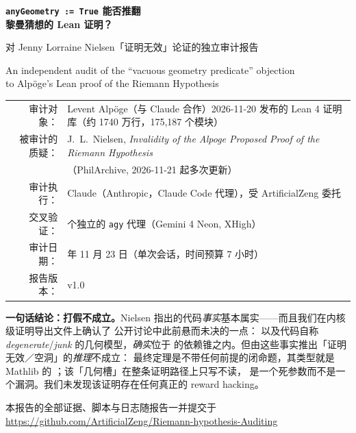 \documentclass[11pt,a4paper]{ctexart}
\begin{document}
\begin{titlepage}
\centering
\vspace*{2.2cm}
{\LARGE\bfseries \texttt{anyGeometry := True} 能否推翻\\[0.35em]黎曼猜想的 Lean 证明？\par}
\vspace{0.9cm}
{\Large 对 Jenny Lorraine Nielsen「证明无效」论证的独立审计报告\par}
\vspace{0.5cm}
{\large An independent audit of the ``vacuous geometry predicate'' objection\\ to Alpöge's Lean proof of the Riemann Hypothesis\par}
\vspace{1.6cm}
\begin{tabularx}{0.94\textwidth}{@{}r>{\raggedright\arraybackslash}X@{}}
审计对象： & Levent Alpöge（与 Claude 合作）2026-11-20 发布的 Lean 4 证明库（约 1740 万行，175,187 个模块）\\[0.25em]
被审计的质疑： & J.~L.~Nielsen, \emph{Invalidity of the Alpoge Proposed Proof of the Riemann Hypothesis}\\
 & （PhilArchive, 2026-11-21 起多次更新）\\[0.25em]
审计执行： & Claude（Anthropic，Claude Code 代理），受 ArtificialZeng 委托\\[0.25em]
交叉验证： & 4 个独立的 \texttt{agy} 代理（Gemini 4 Neon, XHigh）\\[0.25em]
审计日期： & 2026 年 11 月 23 日（单次会话，时间预算 7 小时）\\[0.25em]
报告版本： & v1.0
\end{tabularx}
\vfill
\begin{verdictbox}
\textbf{一句话结论：打假不成立。}Nielsen 指出的代码\emph{事实}基本属实——而且我们在内核级证明导出文件上确认了
公开讨论中此前悬而未决的一点： 以及代码自称 \emph{degenerate}/\emph{junk} 的几何模型，\emph{确实}位于
 的依赖锥之内。但由这些事实推出「证明无效／空洞」的\emph{推理}不成立：
最终定理是不带任何前提的闭命题，其类型就是 Mathlib 的 ；该「几何槽」在整条证明路径上只写不读，
是一个死参数而不是一个漏洞。我们未发现该证明存在任何真正的 reward hacking。
\end{verdictbox}
\vspace{0.6cm}
{\small 本报告的全部证据、脚本与日志随报告一并提交于\\ \url{https://github.com/ArtificialZeng/Riemann-hypothesis-Auditing}\par}
\end{titlepage}

\tableofcontents
\newpage








\appendix

\end{document}
